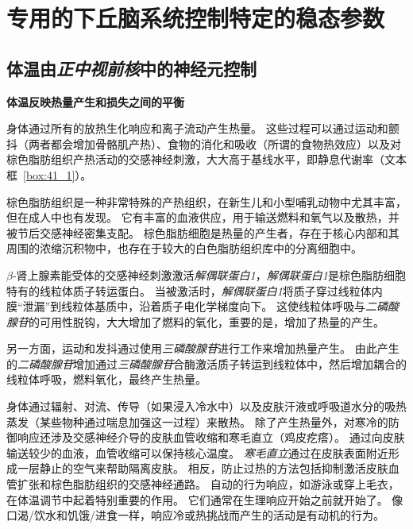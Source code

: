 \section{专用的下丘脑系统控制特定的稳态参数}

\subsection{体温由\textit{正中视前核}中的神经元控制}

\textbf{体温反映热量产生和损失之间的平衡}

身体通过所有的放热生化响应和离子流动产生热量。
这些过程可以通过运动和颤抖（两者都会增加骨骼肌产热）、食物的消化和吸收（所谓的食物热效应）以及对棕色脂肪组织产热活动的交感神经刺激，大大高于基线水平，即静息代谢率（文本框~\ref{box:41_1}）。


\begin{proposition} \label{box:41_1}
	
	\quad \quad 棕色脂肪组织是一种非常特殊的产热组织，在新生儿和小型哺乳动物中尤其丰富，但在成人中也有发现。
	它有丰富的血液供应，用于输送燃料和氧气以及散热，并被节后交感神经密集支配。
	棕色脂肪细胞是热量的产生者，存在于核心内部和其周围的浓缩沉积物中，也存在于较大的白色脂肪组织库中的分离细胞中。
	
	\quad \quad $\beta$-肾上腺素能受体的交感神经刺激激活\textit{解偶联蛋白1}，\textit{解偶联蛋白1}是棕色脂肪细胞特有的线粒体质子转运蛋白。
	当被激活时，\textit{解偶联蛋白1}将质子穿过线粒体内膜“泄漏”到线粒体基质中，沿着质子电化学梯度向下。
	这使线粒体呼吸与\textit{二磷酸腺苷}的可用性脱钩，大大增加了燃料的氧化，重要的是，增加了热量的产生。
	
	\quad \quad 另一方面，运动和发抖通过使用\textit{三磷酸腺苷}进行工作来增加热量产生。
	由此产生的\textit{二磷酸腺苷}增加通过\textit{三磷酸腺苷}合酶激活质子转运到线粒体中，然后增加耦合的线粒体呼吸，燃料氧化，最终产生热量。
	
\end{proposition}


身体通过辐射、对流、传导（如果浸入冷水中）以及皮肤汗液或呼吸道水分的吸热蒸发（某些物种通过喘息加强这一过程）来散热。
除了产生热量外，对寒冷的防御响应还涉及交感神经介导的皮肤血管收缩和寒毛直立（鸡皮疙瘩）。
通过向皮肤输送较少的血液，血管收缩可以保持核心温度。
\textit{寒毛直立}通过在皮肤表面附近形成一层静止的空气来帮助隔离皮肤。
相反，防止过热的方法包括抑制激活皮肤血管扩张和棕色脂肪组织的交感神经通路。
自动的行为响应，如游泳或穿上毛衣，在体温调节中起着特别重要的作用。
它们通常在生理响应开始之前就开始了。
像口渴/饮水和饥饿/进食一样，响应冷或热挑战而产生的活动是有动机的行为。


